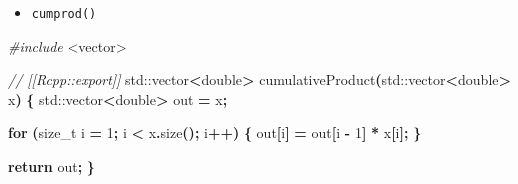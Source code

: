 \documentclass[
]{book}
\newenvironment{Shaded}{\begin{snugshade}}{\end{snugshade}}
\newcommand{\BuiltInTok}[1]{#1}
\newcommand{\CommentTok}[1]{\textcolor[rgb]{0.56,0.35,0.01}{\textit{#1}}}
\newcommand{\ControlFlowTok}[1]{\textcolor[rgb]{0.13,0.29,0.53}{\textbf{#1}}}
\newcommand{\DataTypeTok}[1]{\textcolor[rgb]{0.13,0.29,0.53}{#1}}
\newcommand{\DecValTok}[1]{\textcolor[rgb]{0.00,0.00,0.81}{#1}}
\newcommand{\ImportTok}[1]{#1}
\newcommand{\NormalTok}[1]{#1}
\newcommand{\OperatorTok}[1]{\textcolor[rgb]{0.81,0.36,0.00}{\textbf{#1}}}
\newcommand{\PreprocessorTok}[1]{\textcolor[rgb]{0.56,0.35,0.01}{\textit{#1}}}
\providecommand{\tightlist}{%
  \setlength{\itemsep}{0pt}\setlength{\parskip}{0pt}}
\begin{document}
\begin{itemize}
\tightlist
\item
  \texttt{cumprod()}
\end{itemize}

\begin{Shaded}
\begin{Highlighting}[]
\PreprocessorTok{\#include }\ImportTok{\textless{}vector\textgreater{}}

\CommentTok{// [[Rcpp::export]]}
\BuiltInTok{std::}\NormalTok{vector}\OperatorTok{\textless{}}\DataTypeTok{double}\OperatorTok{\textgreater{}}\NormalTok{ cumulativeProduct}\OperatorTok{(}\BuiltInTok{std::}\NormalTok{vector}\OperatorTok{\textless{}}\DataTypeTok{double}\OperatorTok{\textgreater{}}\NormalTok{ x}\OperatorTok{)}
\OperatorTok{\{}
    \BuiltInTok{std::}\NormalTok{vector}\OperatorTok{\textless{}}\DataTypeTok{double}\OperatorTok{\textgreater{}}\NormalTok{ out }\OperatorTok{=}\NormalTok{ x}\OperatorTok{;}

    \ControlFlowTok{for} \OperatorTok{(}\DataTypeTok{size\_t}\NormalTok{ i }\OperatorTok{=} \DecValTok{1}\OperatorTok{;}\NormalTok{ i }\OperatorTok{\textless{}}\NormalTok{ x}\OperatorTok{.}\NormalTok{size}\OperatorTok{();}\NormalTok{ i}\OperatorTok{++)}
    \OperatorTok{\{}
\NormalTok{        out}\OperatorTok{[}\NormalTok{i}\OperatorTok{]} \OperatorTok{=}\NormalTok{ out}\OperatorTok{[}\NormalTok{i }\OperatorTok{{-}} \DecValTok{1}\OperatorTok{]} \OperatorTok{*}\NormalTok{ x}\OperatorTok{[}\NormalTok{i}\OperatorTok{];}
    \OperatorTok{\}}

    \ControlFlowTok{return}\NormalTok{ out}\OperatorTok{;}
\OperatorTok{\}}
\end{Highlighting}
\end{Shaded}
\end{document}
